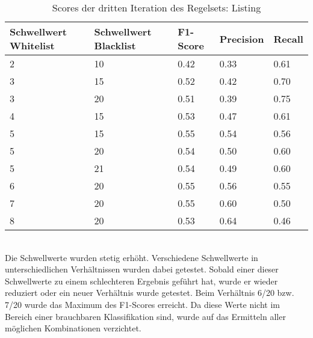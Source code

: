 \begin{table}
	\caption{Scores der dritten Iteration des Regelsets: Listing}
	\centering
\begin{tabular}{|l|l|l|l|l|}
	\hline
	Schwellwert Whitelist & Schwellwert Blacklist & F1-Score & Precision & Recall\\
	\hline
	2 & 10 & 0.42 & 0.33 & 0.61 \\
	3 & 15 & 0.52 & 0.42 & 0.70 \\
	3 & 20 & 0.51 & 0.39 & 0.75 \\
	4 & 15 & 0.53 & 0.47 & 0.61 \\
	5 & 15 & 0.55 & 0.54 & 0.56 \\
	5 & 20 & 0.54 & 0.50 & 0.60 \\
	5 & 21 & 0.54 & 0.49 & 0.60 \\
	6 & 20 & 0.55 & 0.56 & 0.55 \\
	7 & 20 & 0.55 & 0.60 & 0.50 \\
	8 & 20 & 0.53 & 0.64 & 0.46 \\
	\hline
\end{tabular}
\end{table}\\
Die Schwellwerte wurden stetig erhöht.
Verschiedene Schwellwerte in unterschiedlichen Verhältnissen wurden dabei getestet.
Sobald einer dieser Schwellwerte zu einem schlechteren Ergebnis geführt hat, wurde er wieder reduziert oder ein neuer Verhältnis wurde getestet.
Beim Verhältnis 6/20 bzw. 7/20 wurde das Maximum des F1-Scores erreicht.
Da diese Werte nicht im Bereich einer brauchbaren Klassifikation sind, wurde auf das Ermitteln aller möglichen Kombinationen verzichtet.
